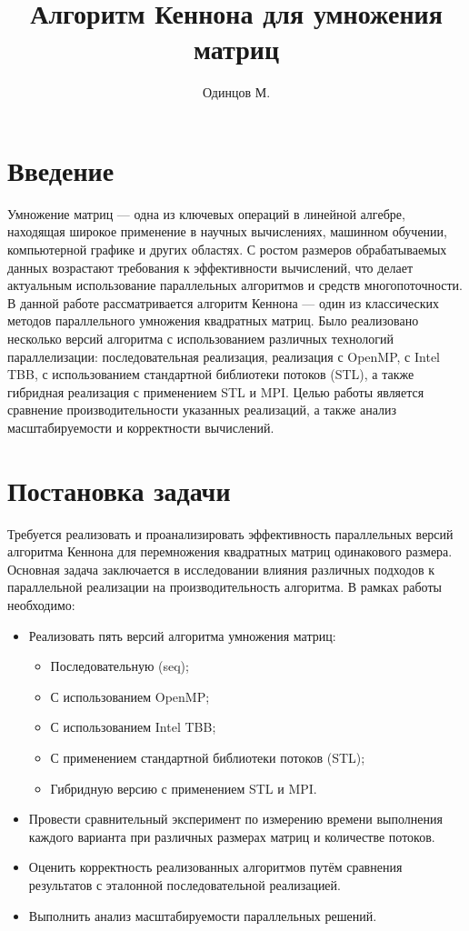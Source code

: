 \documentclass[12pt]{article}
\title{Алгоритм Кеннона для умножения матриц}
\author{Одинцов М.}
\date{}
\begin{document}
\maketitle

\section*{Введение}

Умножение матриц — одна из ключевых операций в линейной алгебре, находящая широкое применение в научных вычислениях, машинном обучении, компьютерной графике и других областях. С ростом размеров обрабатываемых данных возрастают требования к эффективности вычислений, что делает актуальным использование параллельных алгоритмов и средств многопоточности. В данной работе рассматривается алгоритм Кеннона — один из классических методов параллельного умножения квадратных матриц. Было реализовано несколько версий алгоритма с использованием различных технологий параллелизации: последовательная реализация, реализация с OpenMP, с Intel TBB, с использованием стандартной библиотеки потоков (STL), а также гибридная реализация с применением STL и MPI. Целью работы является сравнение производительности указанных реализаций, а также анализ масштабируемости и корректности вычислений.

\newpage

\section*{Постановка задачи}

Требуется реализовать и проанализировать эффективность параллельных версий алгоритма Кеннона для перемножения квадратных матриц одинакового размера. Основная задача заключается в исследовании влияния различных подходов к параллельной реализации на производительность алгоритма. В рамках работы необходимо:

\begin{itemize}
    \item Реализовать пять версий алгоритма умножения матриц:
        \begin{itemize}
            \item Последовательную (seq);
            \item С использованием OpenMP;
            \item С использованием Intel TBB;
            \item С применением стандартной библиотеки потоков (STL);
            \item Гибридную версию с применением STL и MPI.
        \end{itemize}
    \item Провести сравнительный эксперимент по измерению времени выполнения каждого варианта при различных размерах матриц и количестве потоков.
    \item Оценить корректность реализованных алгоритмов путём сравнения результатов с эталонной последовательной реализацией.
    \item Выполнить анализ масштабируемости параллельных решений.
\end{itemize}
\end{document}
